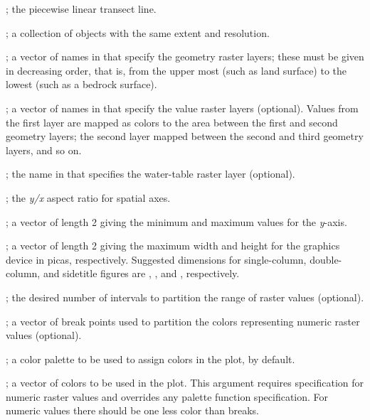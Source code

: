 \documentclass[a4paper]{book}
\begin{document}
%
\begin{Arguments}
\begin{ldescription}
\item[\code{transect}] ; the piecewise linear transect line.
\item[\code{rs}] ; a collection of  objects with the same extent and resolution.
\item[\code{geo.lays}] ; a vector of names in  that specify the geometry raster layers; these must be given in decreasing order, that is, from the upper most (such as land surface) to the lowest (such as a bedrock surface).
\item[\code{val.lays}] ; a vector of names in  that specify the value raster layers (optional).
Values from the first layer are mapped as colors to the area between the first and second geometry layers; the second layer mapped between the second and third geometry layers, and so on.
\item[\code{wt.lay}] ; the name in  that specifies the water-table raster layer (optional).
\item[\code{asp}] ; the \emph{y/x} aspect ratio for spatial axes.
\item[\code{ylim}] ; a vector of length 2 giving the minimum and maximum values for the \emph{y}-axis.
\item[\code{max.dev.dim}] ; a vector of length 2 giving the maximum width and height for the graphics device in picas, respectively.
Suggested dimensions for single-column, double-column, and sidetitle figures are , , and , respectively.
\item[\code{n}] ; the desired number of intervals to partition the range of raster values (optional).
\item[\code{breaks}] ; a vector of break points used to partition the colors representing numeric raster values (optional).
\item[\code{pal}] ; a color palette to be used to assign colors in the plot,  by default.
\item[\code{col}] ; a vector of colors to be used in the plot.
This argument requires  specification for numeric raster values and overrides any palette function specification.
For numeric values there should be one less color than breaks.

\end{ldescription}
\end{Arguments}
\end{document}
